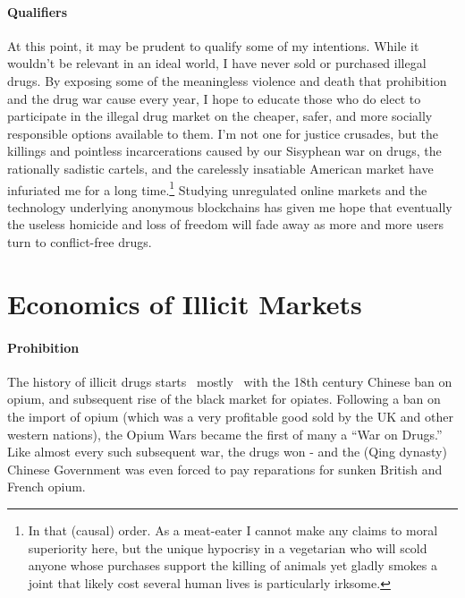 \documentclass[12pt]{article}
\begin{document}
\paragraph{Qualifiers} At this point, it may be prudent to qualify some of my intentions. While it wouldn't be relevant in an ideal world, I have never sold or purchased illegal drugs. By exposing some of the meaningless violence and death that prohibition and the drug war cause every year, I hope to educate those who do elect to participate in the illegal drug market on the cheaper, safer, and more socially responsible options available to them. I'm not one for justice crusades, but the killings and pointless incarcerations caused by our Sisyphean war on drugs, the rationally sadistic cartels, and the carelessly insatiable American market have infuriated me for a long time.\footnote{In that (causal) order. As a meat-eater I cannot make any claims to moral superiority here, but the unique hypocrisy in a vegetarian who will scold anyone whose purchases support the killing of animals yet gladly smokes a joint that likely cost several human lives is particularly irksome.} Studying unregulated online markets and the technology underlying anonymous blockchains has given me hope that eventually the useless homicide and loss of freedom will fade away as more and more users turn to conflict-free drugs.







\section{Economics of Illicit Markets}

\paragraph{Prohibition} The history of illicit drugs starts 
\ mostly \ with the 18th century Chinese ban on opium, and subsequent rise of the black market for opiates. Following a ban on the import of opium (which was a very profitable good sold by the UK and other western nations), the Opium Wars became the first of many a ``War on Drugs.'' Like almost every such subsequent war, the drugs won - and the (Qing dynasty) Chinese Government was even forced to pay reparations for sunken British and French opium.
\\
\end{document}

